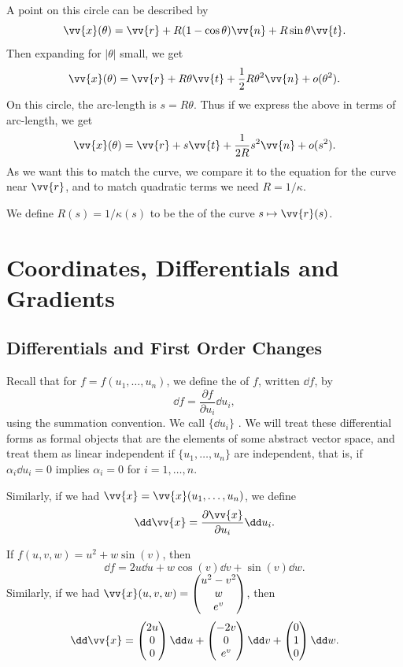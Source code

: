 A point on this circle can be described by
$$
\vv{x}(\theta) = \vv{r} + R(1 - \cos \theta) \vv{n} + R \sin \theta \vv{t}.
$$
Then expanding for $|\theta|$ small, we get
$$
\vv{x} (\theta) = \vv{r} + R \theta \vv{t} + \frac{1}{2} R \theta^2 \vv{n} + o(\theta^2).
$$
On this circle, the arc-length is $s = R \theta$. Thus if we express the above in terms of arc-length, we get
$$
\vv{x}(\theta) = \vv{r} + s \vv{t} + \frac{1}{2R} s^2 \vv{n} + o(s^2).
$$
As we want this to match the curve, we compare it to the equation for the curve near $\vv{r}$, and to match quadratic terms we need
$R = 1/\kappa$.

\begin{definition}
	We define $R(s)=1/\kappa(s)$ to be the  of the curve $s \mapsto \vv{r}(s)$.
\end{definition}

\section{Coordinates, Differentials and Gradients}

\subsection{Differentials and First Order Changes}

Recall that for $f = f(u_1, \dots, u_n)$, we define the  of $f$, written $\dd f$, by
$$
\dd f = \frac{\partial f}{\partial u_i} \dd u_i,
$$
using the summation convention. We call $\{\dd u_i\}$ . We will treat these differential forms as formal objects that are the elements of some abstract vector space, and treat them as linear independent if $\{u_1,  \dots, u_n\}$ are independent, that is, if $\alpha_i \dd u_i = 0$ implies $\alpha_i = 0$ for $i = 1, \dots, n$.

Similarly, if we had $\vv{x} = \vv{x}(u_1, \dots, u_n)$, we define
$$
\dd \vv{x} = \frac{\partial \vv{x}}{\partial u_i} \dd u_i.
$$

\begin{example}
	If $f(u, v, w) = u^2 + w\sin(v)$, then
	$$
	\dd f = 2 u \dd u + w \cos (v) \dd v + \sin (v) \dd w.
$$
Similarly, if we had $\vv{x}(u, v, w) = \begin{pmatrix}
	u^2 - v^2 \\ w \\ e^v
\end{pmatrix}$, then
$$
\dd \vv{x} = \begin{pmatrix}
	2u \\ 0 \\ 0\end{pmatrix}
 \dd u + \begin{pmatrix}
	 - 2v \\ 0 \\ e^v
 \end{pmatrix} \dd v + \begin{pmatrix}
	 0 \\ 1 \\ 0
 \end{pmatrix} \dd w.
$$
\end{example}

